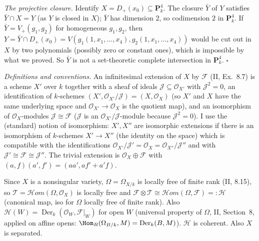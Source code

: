 \documentclass[11pt]{article}
\begin{document}
\emph{The projective closure.} Identify $X=D_+(x_0)\subseteq\mathbf P^4_k$. The closure $\bar Y$ of $Y$ satisfies $\bar Y\cap X=Y$ (as $Y$ is closed in $X$); $\bar Y$ has dimension $2$, so codimension $2$ in $\mathbf P^4_k$. If $\bar Y=V_+(g_1,g_2)$ for homogeneous $g_1,g_2$, then $Y=\bar Y\cap D_+(x_0)=V(g_1(1,x_1,\dots,x_4),g_2(1,x_1,\dots,x_4))$ would be cut out in $X$ by two polynomials (possibly zero or constant ones), which is impossible by what we proved. So $\bar Y$ is not a set-theoretic complete intersection in $\mathbf P^4_k$. \hfill$\square$

\pf
\emph{Definitions and conventions.} An infinitesimal extension of $X$ by $\mathcal F$ (II, Ex.~8.7) is a scheme $X'$ over $k$ together with a sheaf of ideals $\mathcal J\subseteq\mathcal O_{X'}$ with $\mathcal J^2=0$, an identification of $k$-schemes $(X',\mathcal O_{X'}/\mathcal J)=(X,\mathcal O_X)$ (so $X'$ and $X$ have the same underlying space and $\mathcal O_{X'}\to\mathcal O_X$ is the quotient map), and an isomorphism of $\mathcal O_X$-modules $\mathcal J\cong\mathcal F$ ($\mathcal J$ is an $\mathcal O_{X'}/\mathcal J$-module because $\mathcal J^2=0$). I use the (standard) notion of isomorphism: $X',X''$ are isomorphic extensions if there is an isomorphism of $k$-schemes $X'\to X''$ (the identity on the space) which is compatible with the identifications $\mathcal O_{X'}/\mathcal J'=\mathcal O_X=\mathcal O_{X''}/\mathcal J''$ and with $\mathcal J'\cong\mathcal F\cong\mathcal J''$. The trivial extension is $\mathcal O_X\oplus\mathcal F$ with $(a,f)(a',f')=(aa',af'+a'f)$.

Since $X$ is a nonsingular variety, $\Omega=\Omega_{X/k}$ is locally free of finite rank (II, 8.15), so $\mathcal T=\mathcal Hom(\Omega,\mathcal O_X)$ is locally free and $\mathcal F\otimes\mathcal T\cong\mathcal Hom(\Omega,\mathcal F)=:\mathcal H$ (canonical map, iso for $\Omega$ locally free of finite rank). Also $\mathcal H(W)=\operatorname{Der}_k(\mathcal O_W,\mathcal F|_W)$ for open $W$ (universal property of $\Omega$, II, Section~8, applied on affine opens: $\Hom_B(\Omega_{B/k},M)=\operatorname{Der}_k(B,M)$). $\mathcal H$ is coherent. Also $X$ is separated.
\end{document}

